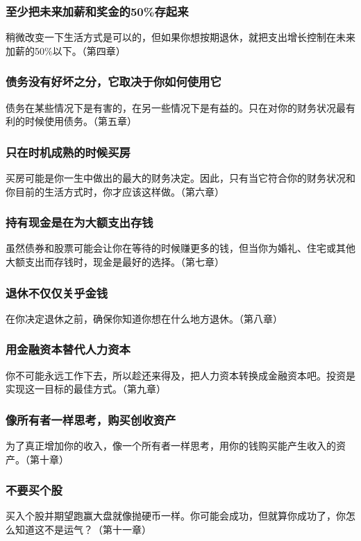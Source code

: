 \subsubsection{至少把未来加薪和奖金的50\%存起来}
稍微改变一下生活方式是可以的，但如果你想按期退休，就把支出增长控制在未来加薪的50\%以下。（第四章）

\subsubsection{债务没有好坏之分，它取决于你如何使用它}
债务在某些情况下是有害的，在另一些情况下是有益的。只在对你的财务状况最有利的时候使用债务。（第五章）

\subsubsection{只在时机成熟的时候买房}
买房可能是你一生中做出的最大的财务决定。因此，只有当它符合你的财务状况和你目前的生活方式时，你才应该这样做。（第六章）

\subsubsection{持有现金是在为大额支出存钱}
虽然债券和股票可能会让你在等待的时候赚更多的钱，但当你为婚礼、住宅或其他大额支出而存钱时，现金是最好的选择。（第七章）

\subsubsection{退休不仅仅关乎金钱}
在你决定退休之前，确保你知道你想在什么地方退休。（第八章）

\subsubsection{用金融资本替代人力资本}
你不可能永远工作下去，所以趁还来得及，把人力资本转换成金融资本吧。投资是实现这一目标的最佳方式。（第九章）

\subsubsection{像所有者一样思考，购买创收资产}
为了真正增加你的收入，像一个所有者一样思考，用你的钱购买能产生收入的资产。（第十章）

\subsubsection{不要买个股}
买入个股并期望跑赢大盘就像抛硬币一样。你可能会成功，但就算你成功了，你怎么知道这不是运气？（第十一章）

